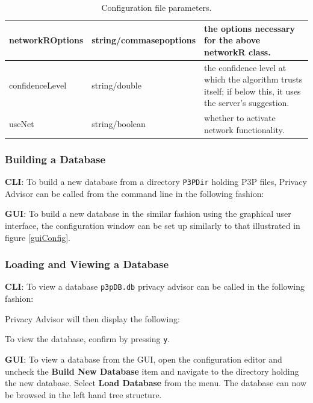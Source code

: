 \begin{center}
\begin{table}[h!]
\begin{tabular} { | l | l | p{7cm} | }
      networkROptions & string/commasepoptions	& the options necessary for the above networkR class. \\ \hline
      confidenceLevel & string/double & the confidence level at which the algorithm trusts itself; if below this, it uses the server's suggestion. \\ \hline
      useNet & string/boolean & whether to activate network functionality. \\ \hline
      \hline
    \end{tabular}
    \caption{Configuration file parameters.}
  \end{table}
\end{center}

\subsubsection{Building a Database}

\textbf{CLI}: To build a new database from a directory \texttt{P3PDir} holding P3P files, Privacy
Advisor can be called from the command line in the following fashion:


\textbf{GUI}: To build a new database in the similar fashion using the
graphical user interface, the configuration window can be set up
similarly to that illustrated in figure \ref{guiConfig}.

\subsubsection{Loading and Viewing a Database}

\textbf{CLI}: To view a database \texttt{p3pDB.db} privacy advisor can be called in the following fashion:


Privacy Advisor will then display the following:


To view the database, confirm by pressing \texttt{y}.

\textbf{GUI}: To view a database from the GUI, open the configuration editor and uncheck the \textbf{Build New Database} item and 
navigate to the directory holding the new database. Select \textbf{Load Database} from the menu. The database can now be browsed in
the left hand tree structure.